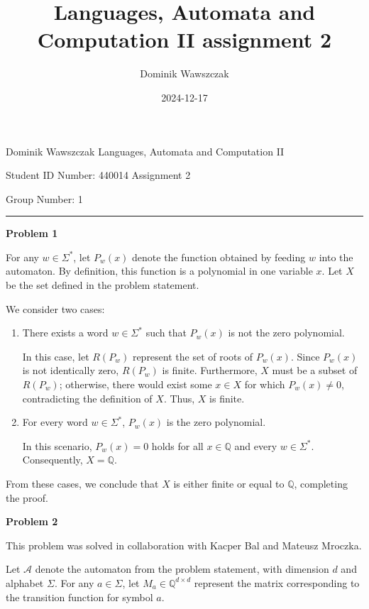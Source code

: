 \documentclass[12pt]{article}
\title{Languages, Automata and Computation II assignment 2}
\author{Dominik Wawszczak}
\date{2024-12-17}
\begin{document}
	\setlength{\parindent}{0 cm}
	
	Dominik Wawszczak \hfill Languages, Automata and Computation II
	
	Student ID Number: 440014 \hfill Assignment 2
	
	Group Number: 1
	
	\bigskip
	\hrule
	\bigskip
	
	\textbf{Problem 1}
	
	\medskip
	
	For any \(w \in \Sigma^{\ast}\), let \(P_{w}(x)\) denote the function
	obtained by feeding \(w\) into the automaton. By definition, this function
	is a polynomial in one variable \(x\). Let \(X\) be the set defined in the
	problem statement.
	
	\medskip
	
	We consider two cases:
	\begin{enumerate}
		\item There exists a word \(w \in \Sigma^{\ast}\) such that \(P_{w}(x)\)
		      is not the zero polynomial.
		      
		      In this case, let \(R(P_{w})\) represent the set of roots of
		      \(P_{w}(x)\). Since \(P_{w}(x)\) is not identically zero,
		      \(R(P_{w})\) is finite. Furthermore, \(X\) must be a subset of
		      \(R(P_{w})\); otherwise, there would exist some \(x \in X\) for
		      which \(P_{w}(x) \neq 0\), contradicting the definition of \(X\).
		      Thus, \(X\) is finite.
		
		\item For every word \(w \in \Sigma^{\ast}\), \(P_{w}(x)\) is the zero
		      polynomial.
		      
		      In this scenario, \(P_{w}(x) = 0\) holds for all \(x \in
		      \mathbb{Q}\) and every \(w \in \Sigma^{\ast}\). Consequently, \(X
		      = \mathbb{Q}\).
	\end{enumerate}
	From these cases, we conclude that \(X\) is either finite or equal to
	\(\mathbb{Q}\), completing the proof.
	
	\bigskip
	
	\textbf{Problem 2}
	
	\medskip
	
	This problem was solved in collaboration with Kacper Bal and Mateusz
	Mroczka.
	
	\medskip
	
	Let \(\mathcal{A}\) denote the automaton from the problem statement, with
	dimension \(d\) and alphabet \(\Sigma\). For any \(a \in \Sigma\), let
	\(M_{a} \in \mathbb{Q}^{d \times d}\) represent the matrix corresponding to
	the transition function for symbol \(a\).
	
\end{document}
